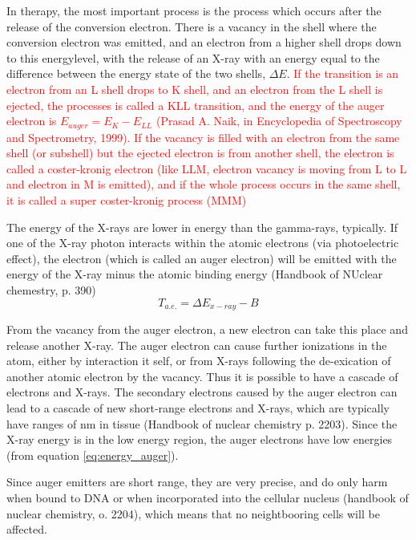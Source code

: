 \noindent 
In therapy, the most important process is the process which occurs after the release of the conversion electron. There is a vacancy in the shell where the conversion electron was emitted, and an electron from a higher shell drops down to this energylevel, with the release of an X-ray with an energy equal to the difference between the energy state of the two shells, $\Delta E$.\textcolor{red}{ If the transition is an electron from an L shell drops to K shell, and an electron from the L shell is ejected, the processes is called a KLL transition, and the energy of the auger electron is $E_{auger}=E_K - E_{LL}$ (Prasad A. Naik, in Encyclopedia of Spectroscopy and Spectrometry, 1999). If the vacancy is filled with an electron from the same shell (or subshell) but the ejected electron is from another shell, the electron is called a coster-kronig electron (like LLM, electron vacancy is moving from L to L and electron in M is emitted), and if the whole process occurs in the same shell, it is called a super coster-kronig process (MMM) }

The energy of the X-rays are lower in energy than the gamma-rays, typically. If one of the X-ray photon interacts within the atomic electrons (via photoelectric effect), the electron (which is called an auger electron) will be emitted with the energy of the X-ray minus the atomic binding energy  (Handbook of NUclear chemestry, p. 390)
\begin{equation} \label{eq:energy_auger}
    T_{a.e.}=\Delta E_{x-ray}-B
\end{equation}

From the vacancy from the auger electron, a new electron can take this place and release another X-ray. The auger electron can cause further ionizations in the atom, either by interaction it self, or from X-rays following the de-exication of another atomic electron by the vacancy. Thus it is possible to have a cascade of electrons and X-rays. The secondary electrons caused by the auger electron can lead to a cascade of new short-range electrons and X-rays, which are typically have ranges of nm in tissue (Handbook of nuclear chemistry p. 2203). Since the X-ray energy is in the low energy region, the auger electrons have low energies (from equation \ref{eq:energy_auger}).  

Since auger emitters are short range, they are very precise, and do only harm when bound to DNA or when incorporated into the cellular nucleus (handbook of nuclear chemistry, o. 2204), which means that no neightbooring cells will be affected. 

